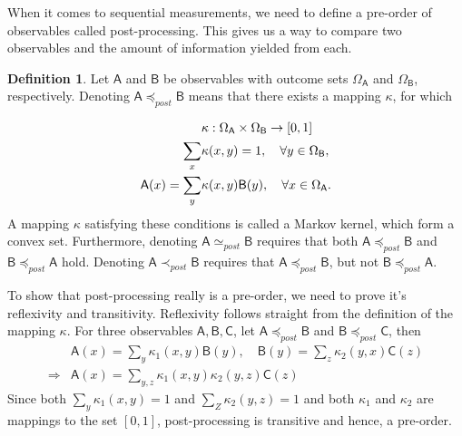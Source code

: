 \documentclass[a4paper,12pt]{wihuri}
\theoremstyle{definition}
\newtheorem{definition}{Definition}
\numberwithin{definition}{section}
\numberwithin{example}{section}
\numberwithin{theorem}{section}
\numberwithin{proposition}{section}
\numberwithin{lemma}{section}
\newcommand{\A}{\mathsf{A}}%
\newcommand{\B}{\mathsf{B}}%
\newcommand{\C}{\mathsf{C}}%
\newcommand{\pp}{\preceq_{post}}
\newcommand{\spp}{\simeq_{post}}
\newcommand{\ppeq}{\prec_{post}}
\begin{document}

When it comes to sequential measurements, we need to define a pre-order of observables called post-processing. This gives us a way to compare two observables and the amount of information yielded from each.
\begin{definition}
Let $\A$ and $\B$ be observables with outcome sets $\Omega_\A$ and $\Omega_\B$, respectively. Denoting $\A \pp \B$ means that there exists a mapping $\kappa$, for which

\begin{align*}
&\kappa : \Omega_\A \times \Omega_\B \rightarrow [0,1]\\
\sum_x &\kappa(x,y) = 1, \quad \forall y \in \Omega_\B, \\
\A(x) = \sum_y &\kappa(x,y)\B(y), \quad \forall x \in \Omega_\A\text.
\end{align*}
A mapping $\kappa$ satisfying these conditions is called a Markov kernel, which form a convex set. Furthermore, denoting $\A \spp \B$ requires that both $\A \pp \B$ and $\B \pp \A$ hold. Denoting $\A \ppeq \B$ requires that $\A \pp \B$, but not $\B \pp \A$.

To show that post-processing really is a pre-order, we need to prove it's reflexivity and transitivity. Reflexivity follows straight from the definition of the mapping $\kappa$. For three observables $\A, \B, \C$, let $\A \pp \B$ and $\B \pp \C$, then
\begin{align*}
&\A(x) = \sum_y \kappa_1(x,y) \B(y), \quad \B(y) = \sum_z \kappa_2(y,x) \C(z) \\
\Rightarrow & \A(x) = \sum_{y,z} \kappa_1(x,y)\kappa_2(y,z)\C(z)
\end{align*}
Since both $\sum_y \kappa_1(x,y) = 1$ and $\sum_Z \kappa_2(y,z) = 1$ and both $\kappa_1$ and $\kappa_2$ are mappings to the set $[0,1]$, post-processing is transitive and hence, a pre-order.
\end{definition}
\end{document}
